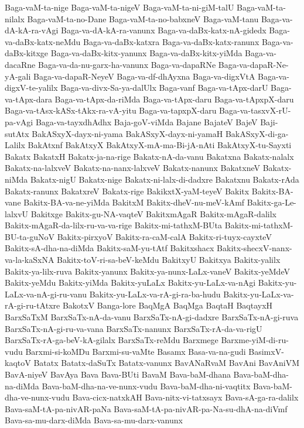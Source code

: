{Baga-vaM-ta-nige
Baga-vaM-ta-nigeV
Baga-vaM-ta-ni-giM-talU
Baga-vaM-ta-nilalx
Baga-vaM-ta-no-Dane
Baga-vaM-ta-no-babxneV
Baga-vaM-tanu
Baga-va-dA-kA-ra-vAgi
Baga-va-dA-kA-ra-vanunx
Baga-va-daBx-katx-nA-gidedx
Baga-va-daBx-katx-neMdu
Baga-va-daBx-katxra
Baga-va-daBx-katx-ranunx
Baga-va-daBx-kitxge
Baga-va-daBx-kitx-yanunx
Baga-va-daBx-kitx-yiMda
Baga-va-dacaRne
Baga-va-da-nu-garx-ha-vanunx
Baga-va-dapaRNe
Baga-va-dapaR-Ne-yA-gali
Baga-va-dapaR-NeyeV
Baga-va-df-dhAyxna
Baga-va-digxVtA
Baga-va-digxV-te-yalilx
Baga-va-divx-Sa-ya-dalUlx
Baga-vanf
Baga-va-tApx-darU
Baga-va-tApx-dara
Baga-va-tApx-da-riMda
Baga-va-tApx-daru
Baga-va-tApxpX-daru
Baga-va-tAsx-kASx-tAkx-ra-vA-yitu
Baga-va-tapxpX-daru
Baga-va-tasxvX-rU-pa-vAgi
Baga-va-tayxdhAdhx
Baja-goV-viMda
Bajane
BajateV
BajeV
Baji-sutAtx
BakASxyX-dayx-ni-yama
BakASxyX-dayx-ni-yamaH
BakASxyX-di-ga-Lalilx
BakAtxnf
BakAtxyX
BakAtxyX-mA-ma-Bi-jA-nAti
BakAtxyX-tu-Sayxti
Bakatx
BakatxH
Bakatx-ja-na-rige
Bakatx-nA-da-vanu
Bakatxna
Bakatx-nalalx
Bakatx-na-lalxveV
Bakatx-na-nanx-lalxveV
Bakatx-nanunx
BakatxneV
Bakatx-niMda
Bakatx-nigU
Bakatx-nige
Bakatx-ni-lalx-di-dadxre
Bakatxnu
Bakatx-rAda
Bakatx-ranunx
BakatxreV
Bakatx-rige
BakikxtX-yaM-teyeV
Bakitx
Bakitx-BA-vane
Bakitx-BA-va-ne-yiMda
BakitxM
Bakitx-dheV-nu-meV-kAmf
Bakitx-ga-Le-lalxvU
Bakitxge
Bakitx-gu-NA-vaqteV
BakitxmAgaR
Bakitx-mAgaR-dalilx
Bakitx-mAgaR-da-lilx-ru-va-va-rige
Bakitx-mi-tathxM-BUta
Bakitx-mi-tathxM-BU-ta-guNoV
Bakitx-pirxyoV
Bakitx-ra-caM-calA
Bakitx-ri-tuyx-cayxteV
Bakitx-sA-dha-na-diMda
Bakitx-saM-yu-tAtf
Bakitxshacx
Bakitx-shecxV-nanx-va-la-kaSxNA
Bakitx-toV-ri-sa-beV-keMdu
BakitxyU
Bakitxya
Bakitx-yalilx
Bakitx-ya-lilx-ruva
Bakitx-yanunx
Bakitx-ya-nunx-LaLx-vaneV
Bakitx-yeMdeV
Bakitx-yeMdu
Bakitx-yiMda
Bakitx-yuLaLx
Bakitx-yu-LaLx-va-nAgi
Bakitx-yu-LaLx-va-nA-gi-ru-vanu
Bakitx-yu-LaLx-va-rA-gi-ra-ba-hudu
Bakitx-yu-LaLx-va-rA-gi-ru-tAtxre
BakotxV
Banga-lore
BaqMgA
BaqMga
BaqtaH
BaqtayxH
BarxSaTxM
BarxSaTx-nA-da-vanu
BarxSaTx-nA-gi-dadxre
BarxSaTx-nA-gi-ruva
BarxSaTx-nA-gi-ru-va-vana
BarxSaTx-nanunx
BarxSaTx-rA-da-va-rigU
BarxSaTx-rA-ga-beV-kA-gilalx
BarxSaTx-reMdu
Barxmege
Barxme-yiM-di-ru-vudu
Barxmi-si-koMDu
Barxmi-su-vaMte
Basamx
Basa-va-na-gudi
BasimxV-kaqtoV
Batatx
Batatx-daSuTx
Batatx-vanunx
BavANaRvaM
BavAni
BavAniVM
BavA-niyeV
BavAya
Bava
Bava-BUti
BavaM
Bava-baM-dhana
Bava-baM-dha-na-diMda
Bava-baM-dha-na-ve-nunx-vudu
Bava-baM-dha-ni-vaqtitx
Bava-baM-dha-ve-nunx-vudu
Bava-cicx-natxkAH
Bava-nitx-vi-tatxsayx
Bava-sA-ga-ra-dalilx
Bava-saM-tA-pa-nivAR-paNa
Bava-saM-tA-pa-nivAR-pa-Na-su-dhA-na-diVmf
Bava-sa-mu-darx-diMda
Bava-sa-mu-darx-vanunx
}

